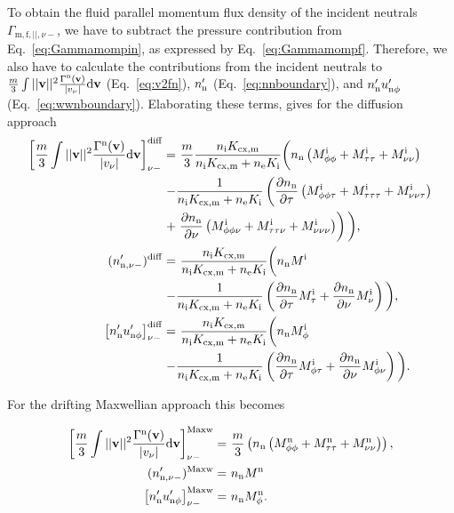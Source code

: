 To obtain the fluid parallel momentum flux density of the incident neutrals $\Gamma_{\mathrm{m,f},||,\nu-}$, we have to subtract the pressure contribution from Eq.~\eqref{eq:Gammamompin}, as expressed by Eq.~\eqref{eq:Gammamompf}. Therefore, we also have to calculate the contributions from the incident neutrals to $\frac{m}{3} \int ||{\bf v}||^{2} \frac{\Gamma^{\mathrm{n}}({\bf v})}{|v_{\nu}|} \mathrm{d} {\bf v}$ (Eq.~\eqref{eq:v2fn}), $n_{\mathrm{n}}'$ (Eq.~\eqref{eq:nnboundary}), and $n_{\mathrm{n}}' u_{\mathrm{n}\phi}'$ (Eq.~\eqref{eq:wwnboundary}). Elaborating these terms, gives for the diffusion approach
\begin{align}
\left [\frac{m}{3} \int ||{\bf v}||^{2} \frac{\Gamma^{\mathrm{n}}({\bf v})}{|v_{\nu}|} \mathrm{d} {\bf v} \right ]_{\nu-}^\mathrm{diff} =& \ \frac{m}{3} \frac{n_{\mathrm{i}}K_{\mathrm{cx,m}}}{n_{\mathrm{i}}K_{\mathrm{cx,m}} + n_{\mathrm{e}}K_{\mathrm{i}}} \bigg ( n_{\mathrm{n}} \left( M_{\phi\phi}^\mathrm{i} + M_{\tau\tau}^\mathrm{i} + M_{\nu\nu}^\mathrm{i} \right) \nonumber \\
- & \frac{1}{n_{\mathrm{i}}K_{\mathrm{cx,m}} + n_{\mathrm{e}}K_{\mathrm{i}}} \left( \frac{\partial n_{\mathrm{n}}}{\partial \tau} \left( M_{\phi\phi\tau}^\mathrm{i} + M_{\tau\tau\tau}^\mathrm{i} + M_{\nu\nu\tau}^\mathrm{i} \right) \right. \nonumber \\
+ & \left. \frac{\partial n_{\mathrm{n}}}{\partial \nu} \left( M_{\phi\phi\nu}^\mathrm{i} + M_{\tau\tau\nu}^\mathrm{i} + M_{\nu\nu\nu}^\mathrm{i} \right) \right) \bigg ), \label{eq:pnin} \\
(n_{\mathrm{n},\nu-}')^\mathrm{diff} =& \ \frac{n_{\mathrm{i}}K_{\mathrm{cx,m}}}{n_{\mathrm{i}}K_{\mathrm{cx,m}} + n_{\mathrm{e}}K_{\mathrm{i}}} \bigg (n_{\mathrm{n}} M^\mathrm{i} \nonumber \\
- & \frac{1}{n_{\mathrm{i}}K_{\mathrm{cx,m}} + n_{\mathrm{e}}K_{\mathrm{i}}} \left (\frac{\partial n_{\mathrm{n}}}{\partial \tau} M^\mathrm{i}_{\tau} + \frac{\partial n_{\mathrm{n}}}{\partial \nu} M^\mathrm{i}_{\nu} \right ) \bigg ), \\
\left [n_{\mathrm{n}}'u_{\mathrm{n}\phi}'\right ]_{\nu-}^\mathrm{diff} =& \ \frac{n_{\mathrm{i}}K_{\mathrm{cx,m}}}{n_{\mathrm{i}}K_{\mathrm{cx,m}} + n_{\mathrm{e}}K_{\mathrm{i}}} \bigg (n_{\mathrm{n}} M_{\phi}^\mathrm{i} \nonumber \\
- & \frac{1}{n_{\mathrm{i}}K_{\mathrm{cx,m}} + n_{\mathrm{e}}K_{\mathrm{i}}} \left (\frac{\partial n_{\mathrm{n}}}{\partial \tau} M_{\phi\tau}^\mathrm{i} + \frac{\partial n_{\mathrm{n}}}{\partial \nu} M_{\phi\nu}^\mathrm{i} \right ) \bigg ). \label{eq:wwnin}
\end{align}

For the drifting Maxwellian approach this becomes

\begin{align}
\left[ \frac{m}{3} \int ||{\bf v}||^{2} \frac{\Gamma^{\mathrm{n}}({\bf v})}{|v_{\nu}|} \mathrm{d} {\bf v} \right]_{\nu-}^\mathrm{Maxw} =& \ \frac{m}{3} \left( n_{\mathrm{n}} \left( M_{\phi\phi}^\mathrm{n} + M_{\tau\tau}^\mathrm{n} + M_{\nu\nu}^\mathrm{n} \right) \right), \label{eq:pnin_maxw} \\
(n_{\mathrm{n},\nu-}')^\mathrm{Maxw} =& \ n_{\mathrm{n}} M^\mathrm{n}  \\
\left [n_{\mathrm{n}}'u_{\mathrm{n}\phi}'\right ]_{\nu-}^\mathrm{Maxw} =& \ n_{\mathrm{n}} M_{\phi}^\mathrm{n}. \label{eq:wwnin_maxw}
\end{align}

